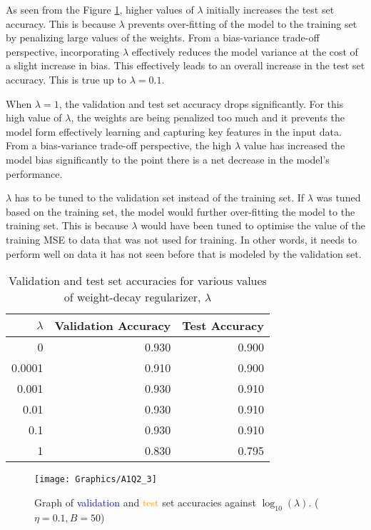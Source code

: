 \documentclass[a4paper,12pt]{article}
\begin{document}
As seen from the Figure \ref{figure:modelAccuracies}, higher values of $\lambda$ initially increases the test set accuracy. This is because $\lambda$ prevents over-fitting of the model to the training set by penalizing large values of the weights. From a bias-variance trade-off perspective, incorporating $\lambda$ effectively reduces the model variance at the cost of a slight increase in bias. This effectively leads to an overall increase in the test set accuracy. This is true up to $\lambda = 0.1$.

When $\lambda = 1$, the validation and test set accuracy drops significantly. For this high value of $\lambda$, the weights are being penalized too much and it prevents the model form effectively learning and capturing key features in the input data. From a bias-variance trade-off perspective, the high $\lambda$ value has increased the model bias significantly to the point there is a net decrease in the model's performance. 

$\lambda$ has to be tuned to the validation set instead of the training set. If $\lambda$ was tuned based on the training set, the model would further over-fitting the model to the training set. This is because $\lambda$ would have been tuned to optimise the value of the training MSE to data that was not used for training. In other words, it needs to perform well on data it has not seen before that is modeled by the validation set. 

\begin{table}[ht]
	\centering %
    \caption{Validation and test set accuracies for various values of 
    	weight-decay regularizer, $\lambda$}
	\label{table:modelAccuracies} %
    \vspace{1em}
	\begin{tabular}{r|r r}
		\toprule
		$\lambda$ & Validation Accuracy & Test Accuracy \\
        \hline
        0 & 0.930 & 0.900 \\
        0.0001 & 0.910 & 0.900 \\
        0.001 & 0.930 & 0.910 \\
        0.01 & 0.930 & 0.910 \\
        0.1 & 0.930 & 0.910 \\
        1 & 0.830 & 0.795 \\
        [1ex] %
		\hline
	\end{tabular}
\end{table}
\begin{figure}[!htb]
	\centering
	\texttt{[image: Graphics/A1Q2\_3]}
    \caption{\label{figure:modelAccuracies} Graph of 
    \textcolor{blue}{validation} and \textcolor{orange}{test} set accuracies
    against $\log_{10}(\lambda)$. ($\eta = 0.1, B = 50$)}
\end{figure} 
\clearpage
\end{document}
